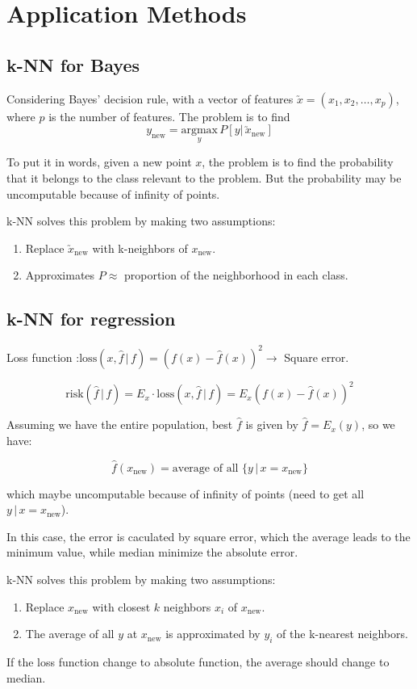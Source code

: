 \documentclass{article}
\begin{document}
\section{Application Methods}{
    \subsection{k-NN for Bayes}{
        Considering Bayes' decision rule, with a vector of features \(\utilde{x} = (x_1, x_2, \dots, x_p)\), where $p$ is the number of features. The problem is to find \[y_{\mathrm{new}} = \underset{y}{\mathrm{argmax}}\, P[y|\, \utilde{x}_{\mathrm{new}}]\]

        To put it in words, given a new point $x$, the problem is to find the probability that it belongs to the class relevant to the problem. But the probability may be uncomputable because of infinity of points.

        k-NN solves this problem by making two assumptions: 
        \begin{enumerate}
            \item Replace \(\utilde{x}_{\mathrm{new}}\) with k-neighbors of \(x_{\mathrm{new}}\). 
            \item Approximates \(P \approx \) proportion of the neighborhood in each class.
        \end{enumerate}
        
    }
    \subsection{k-NN for regression}{
        Loss function :\(\mathrm{loss}(x, \hat{f}\,|\,f) = (f(x) - \hat{f}(x))^2 \rightarrow \) Square error.



        \[\mathrm{risk}(\hat{f}\,|\,f) = E_x \cdot \mathrm{loss}(x, \hat{f}\,|\,f) = E_x(f(x) - \hat{f}(x))^2\]

        Assuming we have the entire population, best \(\hat{f}\) is given by \(\hat{f} = E_x(y)\), so we have:

        \[\hat{f}(x_{\mathrm{new}}) = \text{average of all } \{y\,|\,x=x_{\mathrm{new}}\}\]

        which maybe uncomputable because of infinity of points (need to get all \({y\,|\,x = x_{\mathrm{new}}}\)).

        In this case, the error is caculated by square error, which the average leads to the minimum value, while median minimize the absolute error.

        k-NN solves this problem by making two assumptions:
        \begin{enumerate}
            \item Replace \(x_{\mathrm{new}}\) with closest $k$ neighbors $x_i$ of \(x_{\mathrm{new}}\). 
            \item The average of all $y$ at \(x_{\mathrm{new}}\) is approximated by $y_i$ of the k-nearest neighbors.
        \end{enumerate}

        If the loss function change to absolute function, the average should change to median.
    }
}
\end{document}
